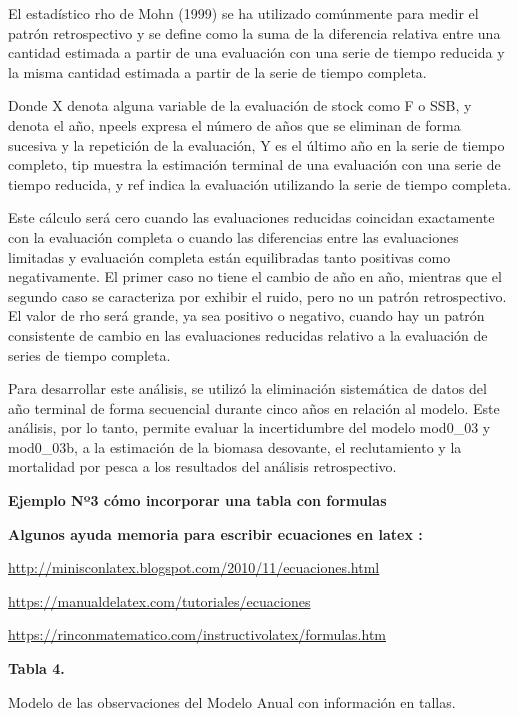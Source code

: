 \documentclass[
  spanish,
]{article}
\begin{document}
El estadístico rho de Mohn (1999) se ha utilizado comúnmente para medir
el patrón retrospectivo y se define como la suma de la diferencia
relativa entre una cantidad estimada a partir de una evaluación con una
serie de tiempo reducida y la misma cantidad estimada a partir de la
serie de tiempo completa.

Donde X denota alguna variable de la evaluación de stock como F o SSB, y
denota el año, npeels expresa el número de años que se eliminan de forma
sucesiva y la repetición de la evaluación, Y es el último año en la
serie de tiempo completo, tip muestra la estimación terminal de una
evaluación con una serie de tiempo reducida, y ref indica la evaluación
utilizando la serie de tiempo completa.

Este cálculo será cero cuando las evaluaciones reducidas coincidan
exactamente con la evaluación completa o cuando las diferencias entre
las evaluaciones limitadas y evaluación completa están equilibradas
tanto positivas como negativamente. El primer caso no tiene el cambio de
año en año, mientras que el segundo caso se caracteriza por exhibir el
ruido, pero no un patrón retrospectivo. El valor de rho será grande, ya
sea positivo o negativo, cuando hay un patrón consistente de cambio en
las evaluaciones reducidas relativo a la evaluación de series de tiempo
completa.

Para desarrollar este análisis, se utilizó la eliminación sistemática de
datos del año terminal de forma secuencial durante cinco años en
relación al modelo. Este análisis, por lo tanto, permite evaluar la
incertidumbre del modelo mod0\_03 y mod0\_03b, a la estimación de la
biomasa desovante, el reclutamiento y la mortalidad por pesca a los
resultados del análisis retrospectivo.

\textbf{Ejemplo Nº3 cómo incorporar una tabla con formulas}

\textbf{Algunos ayuda memoria para escribir ecuaciones en latex :}

\url{http://minisconlatex.blogspot.com/2010/11/ecuaciones.html}

\url{https://manualdelatex.com/tutoriales/ecuaciones}

\url{https://rinconmatematico.com/instructivolatex/formulas.htm}

\small
\begin{center} 
\textbf{Tabla 4.}
\end{center}
\begin{center} 
\vspace{-0.2cm} Modelo de las observaciones del Modelo Anual con información en tallas.
\end{center}
\end{document}
